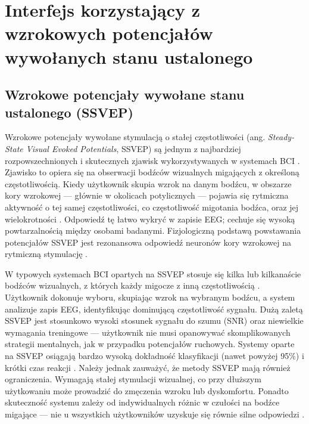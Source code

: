 
\chapter{Interfejs korzystający z wzrokowych potencjałów wywołanych stanu ustalonego}

\section{Wzrokowe potencjały wywołane stanu ustalonego (SSVEP)}

Wzrokowe potencjały wywołane stymulacją o stałej częstotliwości (ang. \textit{Steady-State Visual Evoked Potentials}, SSVEP) są jednym z najbardziej rozpowszechnionych i skutecznych zjawisk wykorzystywanych w systemach BCI \cite{vialatte2010, nakanishi2018}. Zjawisko to opiera się na obserwacji bodźców wizualnych migających z określoną częstotliwością. Kiedy użytkownik skupia wzrok na danym bodźcu, w obszarze kory wzrokowej --- głównie w okolicach potylicznych --- pojawia się rytmiczna aktywność o tej samej częstotliwości, co częstotliwość migotania bodźca, oraz jej wielokrotności \cite{wolpaw2002, friman2007}. Odpowiedź tę łatwo wykryć w zapisie EEG; cechuje się wysoką powtarzalnością między osobami badanymi. Fizjologiczną podstawą powstawania potencjałów SSVEP jest rezonansowa odpowiedź neuronów kory wzrokowej na rytmiczną stymulację \cite{norcia2015, regan1989}.

W typowych systemach BCI opartych na SSVEP stosuje się kilka lub kilkanaście bodźców wizualnych, z których każdy migocze z inną częstotliwością \cite{muller2008, bin2009}. Użytkownik dokonuje wyboru, skupiając wzrok na wybranym bodźcu, a system analizuje zapis EEG, identyfikując dominującą częstotliwość sygnału. Dużą zaletą SSVEP jest stosunkowo wysoki stosunek sygnału do szumu (SNR) oraz niewielkie wymagania treningowe --- użytkownik nie musi opanowywać skomplikowanych strategii mentalnych, jak w przypadku potencjałów ruchowych. Systemy oparte na SSVEP osiągają bardzo wysoką dokładność klasyfikacji (nawet powyżej 95\%) i krótki czas reakcji \cite{nakanishi2018}. Należy jednak zauważyć, że metody SSVEP mają również ograniczenia. Wymagają stałej stymulacji wizualnej, co przy dłuższym użytkowaniu może prowadzić do zmęczenia wzroku lub dyskomfortu. Ponadto skuteczność systemu zależy od indywidualnych różnic w czułości na bodźce migające --- nie u wszystkich użytkowników uzyskuje się równie silne odpowiedzi \cite{vialatte2010, friman2007}.

